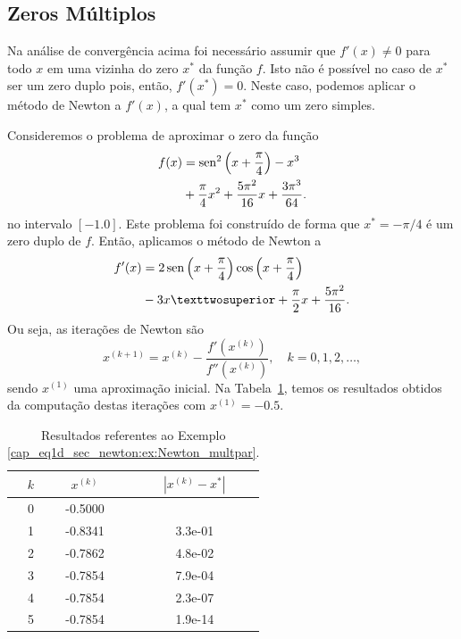 \subsection{Zeros Múltiplos}

Na análise de convergência acima foi necessário assumir que $f'(x) \neq 0$ para todo $x$ em uma vizinha do zero $x^*$ da função $f$. Isto não é possível no caso de $x^*$ ser um zero duplo pois, então, $f'(x^*) = 0$. Neste caso, podemos aplicar o método de Newton a $f'(x)$, a qual tem $x^*$ como um zero simples.

\begin{ex}\label{ex:Newton_multpar}
  Consideremos o problema de aproximar o zero da função
  \begin{equation}\label{cap_eq1d_sec_newton:eq:funex}
    \begin{aligned}
      f(x) &= \operatorname{sen}^2\left(x+\frac{\pi}{4}\right) - x^3 \\
      &+ \frac{\pi}{4}x^2 + \frac{5\pi^2}{16}x + \frac{3\pi^3}{64}.
  \end{aligned}
  \end{equation}
  no intervalo $[-1.0]$. Este problema foi construído de forma que $x^* = -\pi/4$ é um zero duplo de $f$. Então, aplicamos o método de Newton a
  \begin{equation}
    \begin{aligned}
      f'(x) &= 2\sen\left(x+\frac{\pi}{4}\right)\cos\left(x+\frac{\pi}{4}\right) \\
      &- 3x² + \frac{\pi}{2}x+\frac{5\pi^2}{16}.
  \end{aligned}
  \end{equation}
Ou seja, as iterações de Newton são
\begin{equation}
  x^{(k+1)} = x^{(k)} - \frac{f'(x^{(k)})}{f''(x^{(k)})},\quad k=0, 1, 2, \ldots,
\end{equation}
sendo $x^{(1)}$ uma aproximação inicial. Na Tabela~\ref{cap_eq1d_sec_newton:tab:ex_Newton_multpar}, temos os resultados obtidos da computação destas iterações com $x^{(1)}=-0.5$.

\begin{table}[h!]
  \centering
  \caption{Resultados referentes ao Exemplo \ref{cap_eq1d_sec_newton:ex:Newton_multpar}.}
  \label{cap_eq1d_sec_newton:tab:ex_Newton_multpar}
  \begin{tabular}{r|cc}
    $k$ & $x^{(k)}$ & $|x^{(k)}-x^*|$ \\\hline
    0 & -0.5000 & \\
    1 & -0.8341 & 3.3e-01\\
    2 & -0.7862 & 4.8e-02\\
    3 & -0.7854 & 7.9e-04\\
    4 & -0.7854 & 2.3e-07\\
    5 & -0.7854 & 1.9e-14\\\hline
  \end{tabular}
\end{table}

\end{ex}

